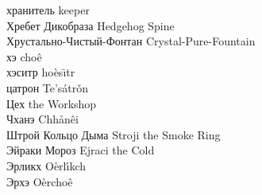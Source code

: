 хранитель \hfill keeper\\
Хребет Дикобраза \hfill Hedgehog Spine\\
Хрустально-Чистый-Фонтан \hfill Crystal-Pure-Fountain\\
хэ \hfill cho\^{e}\\
хэситр \hfill ho\`{e}s\={\i}tr\\
цатрон \hfill Te's\'{a}tr\v{o}n\\
Цех \hfill the Workshop\\
Чханэ \hfill Chh\r{a}n\^{e}i\\
Штрой Кольцо Дыма \hfill Stroji the Smoke Ring\\
Эйраки Мороз \hfill Ejraci the Cold\\
Эрликх \hfill O\r{e}rl\'{\i}kch\\
Эрхэ \hfill O\r{e}rcho\^{e}\\
